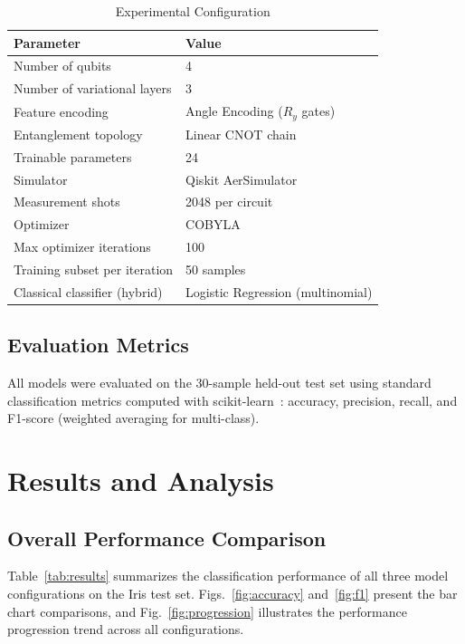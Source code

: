 \documentclass[conference]{IEEEtran}
\begin{document}
\begin{table}[h]
\caption{Experimental Configuration}
\label{tab:config}
\centering
\begin{tabular}{ll}
\toprule
\textbf{Parameter} & \textbf{Value} \\
\midrule
Number of qubits              & 4 \\
Number of variational layers  & 3 \\
Feature encoding              & Angle Encoding ($R_y$ gates) \\
Entanglement topology         & Linear CNOT chain \\
Trainable parameters          & 24 \\
Simulator                     & Qiskit AerSimulator \\
Measurement shots             & 2048 per circuit \\
Optimizer                     & COBYLA \\
Max optimizer iterations      & 100 \\
Training subset per iteration & 50 samples \\
Classical classifier (hybrid) & Logistic Regression (multinomial) \\
\bottomrule
\end{tabular}
\end{table}

\subsection{Evaluation Metrics}

All models were evaluated on the 30-sample held-out test set using standard classification metrics computed with scikit-learn~\cite{pedregosa2011}: accuracy, precision, recall, and F1-score (weighted averaging for multi-class).

\section{Results and Analysis}

\subsection{Overall Performance Comparison}

Table~\ref{tab:results} summarizes the classification performance of all three model configurations on the Iris test set. Figs.~\ref{fig:accuracy} and~\ref{fig:f1} present the bar chart comparisons, and Fig.~\ref{fig:progression} illustrates the performance progression trend across all configurations.
\end{document}
